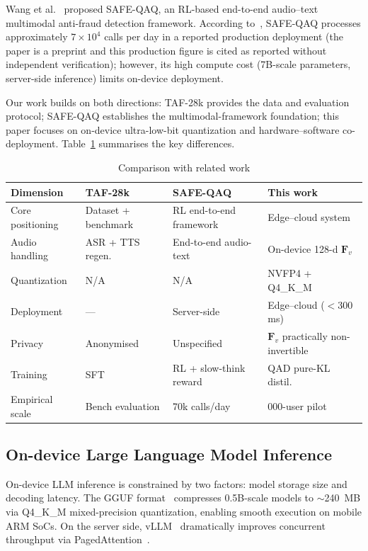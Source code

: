 \documentclass[lettersize,journal]{IEEEtran}
\begin{document}
Wang et al.~\cite{2} proposed SAFE-QAQ, an RL-based end-to-end audio--text multimodal anti-fraud detection framework. According to~\cite{2}, SAFE-QAQ processes approximately $7\times10^4$ calls per day in a reported production deployment (the paper is a preprint and this production figure is cited as reported without independent verification); however, its high compute cost (7B-scale parameters, server-side inference) limits on-device deployment.

Our work builds on both directions: TAF-28k provides the data and evaluation protocol; SAFE-QAQ establishes the multimodal-framework foundation; this paper focuses on on-device ultra-low-bit quantization and hardware--software co-deployment. Table~\ref{tab1} summarises the key differences.

\begin{table}[!t]
\centering\small
\caption{Comparison with related work}
\label{tab1}
\renewcommand{\arraystretch}{1.15}
\setlength{\tabcolsep}{4pt}
\begin{tabular}{>{\raggedright\arraybackslash}p{3.5cm}>{\raggedright\arraybackslash}p{3.5cm}>{\raggedright\arraybackslash}p{5.2cm}>{\raggedright\arraybackslash}p{4.5cm}}
\toprule
\textbf{Dimension} & \textbf{TAF-28k~\cite{1}} & \textbf{SAFE-QAQ~\cite{2}} & \textbf{This work} \\
\midrule
Core positioning & Dataset + benchmark & RL end-to-end framework & Edge--cloud system \\
Audio handling & ASR + TTS regen. & End-to-end audio-text & On-device 128-d $\bm{F}_v$ \\
Quantization & N/A & N/A & NVFP4 + Q4\_K\_M \\
Deployment & --- & Server-side & Edge--cloud ($<$300 ms) \\
Privacy & Anonymised & Unspecified & $\bm{F}_v$ practically non-invertible \\
Training & SFT & RL + slow-think reward & QAD pure-KL distil. \\
Empirical scale & Bench evaluation & 70k calls/day & 2{,}000-user pilot\\
\bottomrule
\end{tabular}
\end{table}

\subsection{On-device Large Language Model Inference}

On-device LLM inference is constrained by two factors: model storage size and decoding latency. The GGUF format~\cite{17} compresses 0.5B-scale models to $\sim$240~MB via Q4\_K\_M mixed-precision quantization, enabling smooth execution on mobile ARM SoCs. On the server side, vLLM~\cite{18} dramatically improves concurrent throughput via PagedAttention~\cite{19}.
\end{document}
